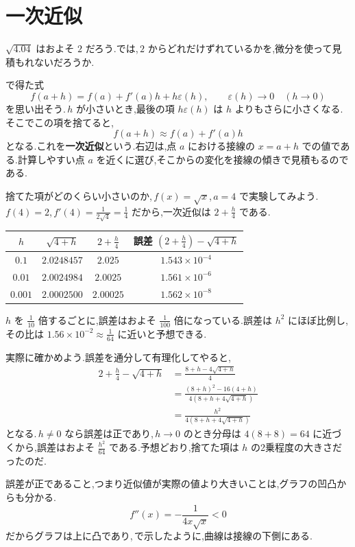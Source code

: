\section{一次近似}\label{節:一次近似}
$\sqrt{4.04}$ はおよそ $2$ だろう.では,\,$2$ からどれだけずれているかを,微分を使って見積もれないだろうか.

で得た式
\[
 f(a+h)=f(a)+f'(a)h+h\varepsilon(h),\qquad \varepsilon(h)\to0\quad(h\to0)
\]
を思い出そう.\,$h$ が小さいとき,最後の項 $h\varepsilon(h)$ は $h$ よりもさらに小さくなる.そこでこの項を捨てると,
\[
 f(a+h)\approx f(a)+f'(a)h
\]
となる.これを\textbf{一次近似}という.右辺は,点 $a$ における接線の $x=a+h$ での値である.計算しやすい点 $a$ を近くに選び,そこからの変化を接線の傾きで見積もるのである.

捨てた項がどのくらい小さいのか,\,$f(x)=\sqrt x$,\,$a=4$ で実験してみよう.\,$f(4)=2$,\,$f'(4)=\frac1{2\sqrt4}=\frac14$ だから,一次近似は $2+\frac h4$ である.
\begin{center}
\begin{tabular}{cccc}
\toprule
$h$ & $\sqrt{4+h}$ & $2+\frac h4$ & 誤差 $\left(2+\frac h4\right)-\sqrt{4+h}$\\
\midrule
$0.1$ & $2.0248457$ & $2.025$ & $1.543\times10^{-4}$\\
$0.01$ & $2.0024984$ & $2.0025$ & $1.561\times10^{-6}$\\
$0.001$ & $2.0002500$ & $2.00025$ & $1.562\times10^{-8}$\\
\bottomrule
\end{tabular}
\end{center}
$h$ を $\frac1{10}$ 倍するごとに,誤差はおよそ $\frac1{100}$ 倍になっている.誤差は $h^2$ にほぼ比例し,その比は $1.56\times10^{-2}\approx\frac1{64}$ に近いと予想できる.

実際に確かめよう.誤差を通分して有理化してやると,
\begin{align*}
 2+\frac h4-\sqrt{4+h}
 &=\frac{8+h-4\sqrt{4+h}}{4}\\
 &=\frac{(8+h)^2-16(4+h)}{4\left(8+h+4\sqrt{4+h}\right)}\\
 &=\frac{h^2}{4\left(8+h+4\sqrt{4+h}\right)}
\end{align*}
となる.\,$h\ne0$ なら誤差は正であり,\,$h\to0$ のとき分母は $4(8+8)=64$ に近づくから,誤差はおよそ $\frac{h^2}{64}$ である.予想どおり,捨てた項は $h$ の2乗程度の大きさだったのだ.

誤差が正であること,つまり近似値が実際の値より大きいことは,グラフの凹凸からも分かる.
\[
 f''(x)=-\frac1{4x\sqrt x}<0
\]
だからグラフは上に凸であり,\,で示したように,曲線は接線の下側にある.

